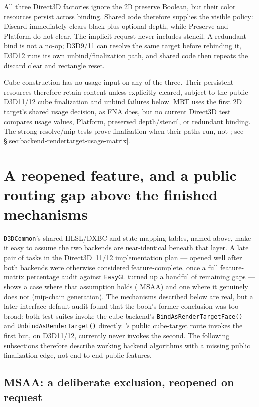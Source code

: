 All three Direct3D factories ignore the 2D preserve Boolean, but their color resources persist
across binding. Shared code therefore supplies the visible policy: Discard immediately clears
black plus optional depth, while Preserve and Platform do not clear. The implicit request
never includes stencil. A redundant bind is not a no-op; D3D9/11 can resolve the same target
before rebinding it, D3D12 runs its own unbind/finalization path, and shared code then repeats
the discard clear and rectangle reset.

Cube construction has no usage input on any of the three. Their persistent resources
therefore retain content unless explicitly cleared, subject to the public D3D11/12
cube finalization and unbind failures below. MRT uses the first 2D target's shared usage
decision, as FNA does, but no current Direct3D test compares usage values, Platform, preserved
depth/stencil, or redundant binding. The strong resolve/mip tests prove finalization when their
paths run, not ; see
\S\ref{sec:backend-rendertarget-usage-matrix}.

\section{A reopened feature, and a public routing gap above the finished mechanisms}

\texttt{D3DCommon}'s shared HLSL/DXBC and state-mapping tables, named above, make it easy to
assume the two backends are near-identical beneath that layer. A late pair of tasks in the
Direct3D~11/12 implementation plan --- opened well after both backends were otherwise
considered feature-complete, once a full feature-matrix percentage audit against \texttt{EasyGL}
turned up a handful of remaining gaps --- shows a case where that assumption holds
( MSAA) and one where it genuinely does not (mip-chain generation).
The mechanisms described below are real, but a later interface-default audit found that the
book's former conclusion was too broad: both test suites invoke the cube backend's
\texttt{BindAsRenderTargetFace()} and \texttt{UnbindAsRenderTarget()} directly.
's public cube-target route invokes the first but, on D3D11/12,
currently never invokes the second. The following subsections therefore describe working
backend algorithms with a missing public finalization edge, not end-to-end public features.

\subsection{ MSAA: a deliberate exclusion, reopened on request}

